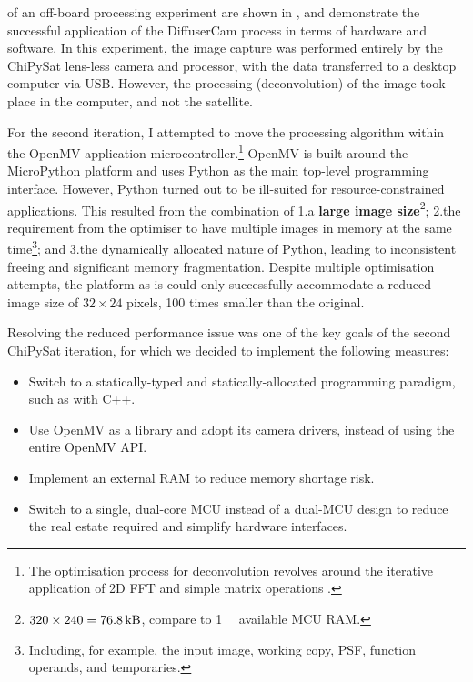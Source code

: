 \documentclass[a4paper,nobib,justified,final]{tufte-book}
\begin{document}
 of an off-board processing experiment are shown in , and demonstrate the successful application of the DiffuserCam process in terms of hardware and software. In this experiment, the image capture was performed entirely by the ChiPySat lens-less camera and processor, with the data transferred to a desktop computer via \acs{USB}. However, the processing (deconvolution) of the image took place in the computer, and not the satellite.

For the second iteration, I attempted to move the processing algorithm within the OpenMV application microcontroller.\footnote{The optimisation process for deconvolution revolves around the iterative application of 2D \acs{FFT} and simple matrix operations \cite{kuoDiffuserCamDiffuserBasedLensless2017}.} OpenMV is built around the MicroPython platform and uses Python as the main top-level programming interface. However, Python turned out to be ill-suited for resource-constrained applications. This resulted from the combination of 1.\@ a \textbf{large image size}\footnote{\(320\times 240 = \qty{76.8}{\kilo\byte} \), compare to \qty{1}{\mega\byte} available \acs{MCU} \acs{RAM}.}; 2.\@ the requirement from the optimiser to have multiple images in memory at the same time\footnote{Including, for example, the input image, working copy, \acs{PSF}, function operands, and temporaries.}; and 3.\@  the dynamically allocated nature of Python, leading to inconsistent freeing and significant memory fragmentation. Despite multiple optimisation attempts, the platform as-is could only successfully accommodate a reduced image size of \(32\times 24\) pixels, 100 times smaller than the original.

Resolving the reduced performance issue was one of the key goals of the second ChiPySat iteration, for which we decided to implement the following measures:
\begin{itemize}[itemsep=-2ex]
	\item Switch to a statically-typed and statically-allocated programming paradigm, such as with C++.
	\item Use OpenMV as a library and adopt its camera drivers, instead of using the entire OpenMV \acs{API}.
	\item Implement an external \acl{RAM} to reduce memory shortage risk.
	\item Switch to a single, dual-core \acs{MCU} instead of a dual-\acs{MCU} design to reduce the real estate required and simplify hardware interfaces.
\end{itemize}
\end{document}
